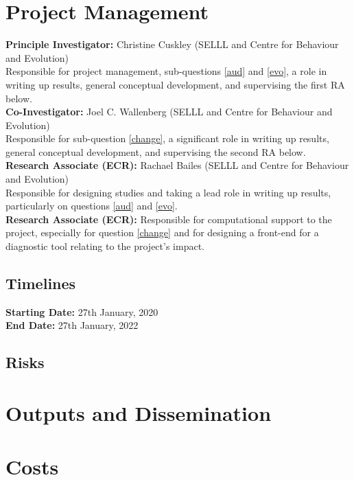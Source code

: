 \documentclass[11pt]{article}
\begin{document}
\section{Project Management}

\noindent\textbf{Principle Investigator:} Christine Cuskley (SELLL and Centre for Behaviour and Evolution)\\
Responsible for project management, sub-questions \ref{aud} and \ref{evo}, a role in writing up results, general conceptual development, and supervising the first RA below.\\

\noindent\textbf{Co-Investigator:} Joel C. Wallenberg (SELLL and Centre for Behaviour and Evolution)\\
Responsible for sub-question \ref{change}, a significant role in writing up results, general conceptual development, and supervising the second RA below.\\

\noindent\textbf{Research Associate (ECR):} Rachael Bailes (SELLL and Centre for Behaviour and Evolution)\\
Responsible for designing studies and taking a lead role in writing up results, particularly on questions \ref{aud} and \ref{evo}. \\

\noindent\textbf{Research Associate (ECR):} Responsible for computational support to the project, especially for question \ref{change} and for designing a front-end for a diagnostic tool relating to the project's impact.


\subsection{Timelines}

\noindent \textbf{Starting Date:} 27th January, 2020\\
\noindent \textbf{End Date:} 27th January, 2022

\subsection{Risks}

\section{Outputs and Dissemination}

\section{Costs}
\end{document}
